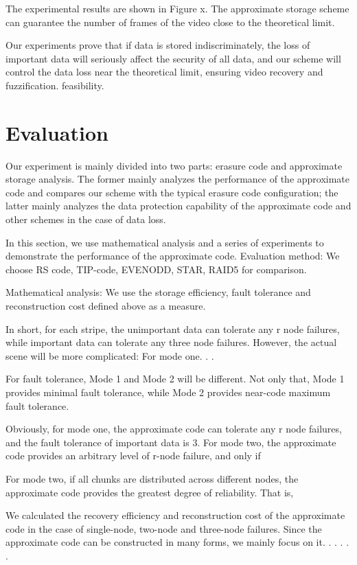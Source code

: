 \documentclass[sigconf]{acmart}
\begin{document}
The experimental results are shown in Figure x. The approximate storage scheme can guarantee the number of frames of the video close to the theoretical limit.


Our experiments prove that if data is stored indiscriminately, the loss of important data will seriously affect the security of all data, and our scheme will control the data loss near the theoretical limit, ensuring video recovery and fuzzification. feasibility.

\section{Evaluation}\label{evaluation}

Our experiment is mainly divided into two parts: erasure code and approximate storage analysis. The former mainly analyzes the performance of the approximate code and compares our scheme with the typical erasure code configuration; the latter mainly analyzes the data protection capability of the approximate code and other schemes in the case of data loss.



In this section, we use mathematical analysis and a series of experiments to demonstrate the performance of the approximate code.
Evaluation method: We choose RS code, TIP-code, EVENODD, STAR, RAID5 for comparison.

Mathematical analysis: We use the storage efficiency, fault tolerance and reconstruction cost defined above as a measure.

In short, for each stripe, the unimportant data can tolerate any r node failures, while important data can tolerate any three node failures. However, the actual scene will be more complicated:
For mode one. . .


For fault tolerance, Mode 1 and Mode 2 will be different. Not only that, Mode 1 provides minimal fault tolerance, while Mode 2 provides near-code maximum fault tolerance.

Obviously, for mode one, the approximate code can tolerate any r node failures, and the fault tolerance of important data is 3. For mode two, the approximate code provides an arbitrary level of r-node failure, and only if

For mode two, if all chunks are distributed across different nodes, the approximate code provides the greatest degree of reliability. That is,



We calculated the recovery efficiency and reconstruction cost of the approximate code in the case of single-node, two-node and three-node failures. Since the approximate code can be constructed in many forms, we mainly focus on it. . . . . .
\end{document}
